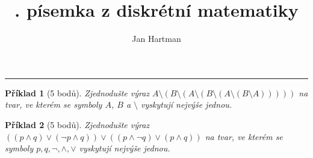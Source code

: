 \documentclass[10pt]{article}
\title{\tutnum. písemka z diskrétní matematiky}
\author{Jan Hartman}
\newcommand{\titlerule}{%
    \noindent %
    \makebox[\textwidth]{\large \thetitle \hfill Jméno: \hspace{3cm}}
    \rule{\textwidth}{0.4pt}%
}
\theoremstyle{definitionstyle}
\theoremstyle{problemstyle}
\newtheorem{problem}{Příklad}
\begin{document}
\titlerule

\begin{problem}[5 bodů]
Zjednodušte výraz $A \setminus ( B \setminus ( A \setminus ( B \setminus ( A \setminus ( B \setminus A )))))$ na tvar, ve kterém se symboly $A$, $B$ a $\setminus$ vyskytují nejvýše jednou.
\end{problem}

\begin{problem}[5 bodů]
Zjednodušte výraz $((p \wedge q) \vee (\neg p \wedge q) ) \vee ( (p \wedge \neg q) \vee (p \wedge q)  )$ na tvar, ve kterém se symboly $p,q,\neg,\wedge,\vee$ vyskytují nejvýše jednou.
\end{problem}

\end{document}
